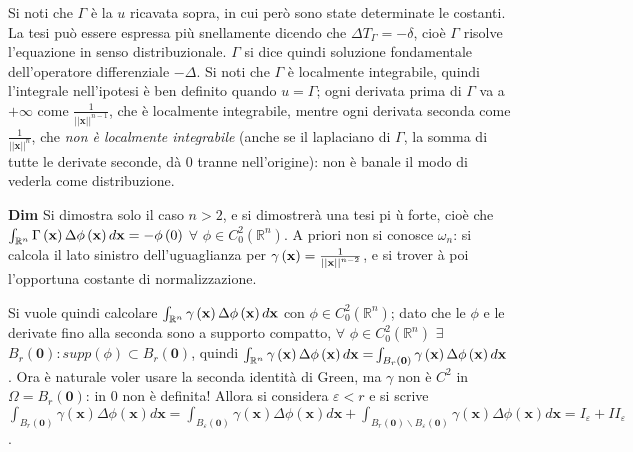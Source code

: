 \documentclass{article}
\begin{document}
Si noti che $\Gamma $ \`{e} la $u$ ricavata sopra, in cui per\`{o} sono
state determinate le costanti. La tesi pu\`{o} essere espressa pi\`{u}
snellamente dicendo che $\Delta T_{\Gamma }=-\delta $, cio\`{e} $\Gamma $
risolve l'equazione in senso distribuzionale. $\Gamma $ si dice quindi
soluzione fondamentale dell'operatore differenziale $-\Delta $. Si noti che $%
\Gamma $ \`{e} localmente integrabile, quindi l'integrale nell'ipotesi \`{e}
ben definito quando $u=\Gamma $; ogni derivata prima di $\Gamma $ va a $%
+\infty $ come $\frac{1}{\left\vert \left\vert \mathbf{x}\right\vert
\right\vert ^{n-1}}$, che \`{e} localmente integrabile, mentre ogni derivata
seconda come $\frac{1}{\left\vert \left\vert \mathbf{x}\right\vert
\right\vert ^{n}}$, che \textit{non \`{e} localmente integrabile} (anche se
il laplaciano di $\Gamma $, la somma di tutte le derivate seconde, d\`{a} $0$
tranne nell'origine): non \`{e} banale il modo di vederla come distribuzione.

\textbf{Dim} Si dimostra solo il caso $n>2$, e si dimostrer\`{a} una tesi pi%
\`{u} forte, cio\`{e} che $\int_{%
\mathbb{R}
^{n}}\Gamma \left( \mathbf{x}\right) \Delta \phi \left( \mathbf{x}\right) d%
\mathbf{x}=-\phi \left( 0\right) $ $\forall $ $\phi \in C_{0}^{2}\left( 
\mathbb{R}
^{n}\right) $. A priori non si conosce $\omega _{n}$: si calcola il lato
sinistro dell'uguaglianza per $\gamma \left( \mathbf{x}\right) =\frac{1}{%
\left\vert \left\vert \mathbf{x}\right\vert \right\vert ^{n-2}}$, e si trover%
\`{a} poi l'opportuna costante di normalizzazione.

Si vuole quindi calcolare $\int_{%
\mathbb{R}
^{n}}\gamma \left( \mathbf{x}\right) \Delta \phi \left( \mathbf{x}\right) d%
\mathbf{x}$ con $\phi \in C_{0}^{2}\left( 
\mathbb{R}
^{n}\right) $; dato che le $\phi $ e le derivate fino alla seconda sono a
supporto compatto, $\forall $ $\phi \in C_{0}^{2}\left( 
\mathbb{R}
^{n}\right) $ $\exists $ $B_{r}\left( \mathbf{0}\right) :supp\left( \phi
\right) \subset B_{r}\left( \mathbf{0}\right) $, quindi $\int_{%
\mathbb{R}
^{n}}\gamma \left( \mathbf{x}\right) \Delta \phi \left( \mathbf{x}\right) d%
\mathbf{x=}\int_{B_{r}\left( \mathbf{0}\right) }\gamma \left( \mathbf{x}%
\right) \Delta \phi \left( \mathbf{x}\right) d\mathbf{x}$. Ora \`{e}
naturale voler usare la seconda identit\`{a} di Green, ma $\gamma $ non \`{e}
$C^{2}$ in $\Omega =B_{r}\left( \mathbf{0}\right) $: in $0$ non \`{e}
definita! Allora si considera $\varepsilon <r$ e si scrive $%
\int_{B_{r}\left( \mathbf{0}\right) }\gamma \left( \mathbf{x}\right) \Delta
\phi \left( \mathbf{x}\right) d\mathbf{x=}\int_{B_{\varepsilon }\left( 
\mathbf{0}\right) }\gamma \left( \mathbf{x}\right) \Delta \phi \left( 
\mathbf{x}\right) d\mathbf{x+}\int_{B_{r}\left( \mathbf{0}\right) \backslash
B_{\varepsilon }\left( \mathbf{0}\right) }\gamma \left( \mathbf{x}\right)
\Delta \phi \left( \mathbf{x}\right) d\mathbf{x}=I_{\varepsilon
}+II_{\varepsilon }$.
\end{document}
